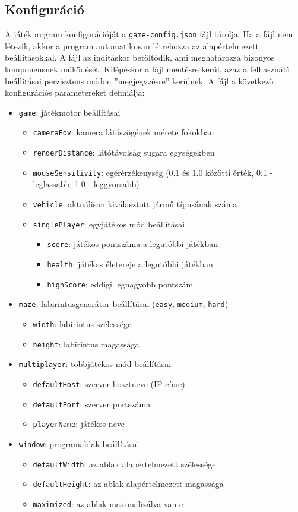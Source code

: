 \subsection{Konfiguráció}

A játékprogram konfigurációját a \verb|game-config.json| fájl tárolja. Ha a fájl nem létezik, akkor a program automatikusan létrehozza az alapértelmezett beállításokkal. A fájl az indításkor betöltődik, ami meghatározza bizonyos komponensnek működését. Kilépéskor a fájl mentésre kerül, azaz a felhasználó beállításai perzisztens módon ''megjegyzésre'' kerülnek. A fájl a következő konfigurációs paramétereket definiálja:

\begin{itemize}
	\item \verb|game|: játékmotor beállításai
	\begin{itemize}
		\item \verb|cameraFov|: kamera látószögének mérete fokokban
		\item \verb|renderDistance|: látótávolság sugara egységekben
		\item \verb|mouseSensitivity|: egérérzékenység (0.1 és 1.0 közötti érték, 0.1 - leglassabb, 1.0 - leggyorsabb)
		\item \verb|vehicle|: aktuálisan kiválasztott jármű típusának száma
		\item \verb|singlePlayer|: egyjátékos mód beállításai
		\begin{itemize}
			\item \verb|score|: játékos pontszáma a legutóbbi játékban
			\item \verb|health|: játékos életereje a legutóbbi játékban
			\item \verb|highScore|: eddigi legnagyobb pontszám
		\end{itemize}
	\end{itemize}
	\item \verb|maze|: labirintusgenerátor beállításai (\verb|easy|, \verb|medium|, \verb|hard|)
	\begin{itemize}
		\item \verb|width|: labirintus szélessége
		\item \verb|height|: labirintus magassága
	\end{itemize}
	\item \verb|multiplayer|: többjátékos mód beállításai
	\begin{itemize}
		\item \verb|defaultHost|: szerver hosztneve (IP címe)
		\item \verb|defaultPort|: szerver portszáma
		\item \verb|playerName|: játékos neve
	\end{itemize}
	\item \verb|window|: programablak beállításai
	\begin{itemize}
		\item \verb|defaultWidth|: az ablak alapértelmezett szélessége
		\item \verb|defaultHeight|: az ablak alapértelmezett magassága
		\item \verb|maximized|: az ablak maximalizálva van-e
	\end{itemize}
\end{itemize}

